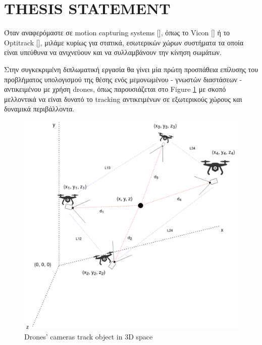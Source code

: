 \section{THESIS STATEMENT}
Όταν αναφερόμαστε σε motion capturing systems [\cite{7}], όπως το Vicon [\cite{8}] 
ή το Optitrack [\cite{9}], μιλάμε κυρίως για στατικά, εσωτερικών χώρων συστήματα 
τα οποία είναι υπεύθυνα να ανιχνεύουν και να συλλαμβάνουν την κίνηση σωμάτων.

Στην συγκεκριμένη διπλωματική εργασία θα γίνει μία πρώτη προ\-σπά\-θεια επίλυσης του 
προβλήματος υπολογισμού της θέσης ενός μεμονωμένου - γνωστών διαστάσεων - αντικειμένου 
με χρήση drones, όπως παρουσιάζεται στο Figure \ref{fig:1} με σκοπό μελλοντικά να είναι 
δυνατό το tracking αντικειμένων σε εξωτερικούς χώρους και δυναμικά περιβάλλοντα.

\begin{figure}[thpb]
  \centering
  \includegraphics[width=\linewidth]{Images/3dDrones-camera-pose.png}
  \caption{Drones' cameras track object in 3D space}
  \label{fig:1}
\end{figure}


